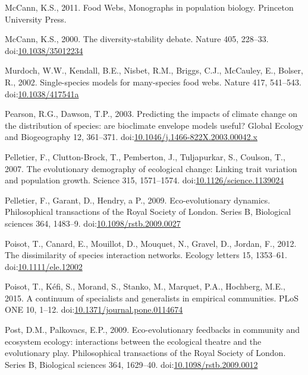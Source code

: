 \hypertarget{ref-mccann2011food}{}
McCann, K.S., 2011. Food Webs, Monographs in population biology.
Princeton University Press.

\hypertarget{ref-McCann2000}{}
McCann, K.S., 2000. The diversity-stability debate. Nature 405, 228--33.
doi:\href{https://doi.org/10.1038/35012234}{10.1038/35012234}

\hypertarget{ref-Murdoch2002}{}
Murdoch, W.W., Kendall, B.E., Nisbet, R.M., Briggs, C.J., McCauley, E.,
Bolser, R., 2002. Single-species models for many-species food webs.
Nature 417, 541--543.
doi:\href{https://doi.org/10.1038/417541a}{10.1038/417541a}

\hypertarget{ref-Pearson2003}{}
Pearson, R.G., Dawson, T.P., 2003. Predicting the impacts of climate
change on the distribution of species: are bioclimate envelope models
useful? Global Ecology and Biogeography 12, 361--371.
doi:\href{https://doi.org/10.1046/j.1466-822X.2003.00042.x}{10.1046/j.1466-822X.2003.00042.x}

\hypertarget{ref-Pelletier2007}{}
Pelletier, F., Clutton-Brock, T., Pemberton, J., Tuljapurkar, S.,
Coulson, T., 2007. The evolutionary demography of ecological change:
Linking trait variation and population growth. Science 315, 1571--1574.
doi:\href{https://doi.org/10.1126/science.1139024}{10.1126/science.1139024}

\hypertarget{ref-Pelletier2009}{}
Pelletier, F., Garant, D., Hendry, a P., 2009. Eco-evolutionary
dynamics. Philosophical transactions of the Royal Society of London.
Series B, Biological sciences 364, 1483--9.
doi:\href{https://doi.org/10.1098/rstb.2009.0027}{10.1098/rstb.2009.0027}

\hypertarget{ref-Poisot2012}{}
Poisot, T., Canard, E., Mouillot, D., Mouquet, N., Gravel, D., Jordan,
F., 2012. The dissimilarity of species interaction networks. Ecology
letters 15, 1353--61.
doi:\href{https://doi.org/10.1111/ele.12002}{10.1111/ele.12002}

\hypertarget{ref-Poisot2015c}{}
Poisot, T., Kéfi, S., Morand, S., Stanko, M., Marquet, P.A., Hochberg,
M.E., 2015. A continuum of specialists and generalists in empirical
communities. PLoS ONE 10, 1--12.
doi:\href{https://doi.org/10.1371/journal.pone.0114674}{10.1371/journal.pone.0114674}

\hypertarget{ref-Post2009}{}
Post, D.M., Palkovacs, E.P., 2009. Eco-evolutionary feedbacks in
community and ecosystem ecology: interactions between the ecological
theatre and the evolutionary play. Philosophical transactions of the
Royal Society of London. Series B, Biological sciences 364, 1629--40.
doi:\href{https://doi.org/10.1098/rstb.2009.0012}{10.1098/rstb.2009.0012}


